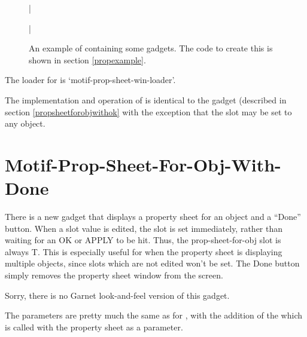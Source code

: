 \begin{figure}
\bar{}
\begin{center}
\end{center}
\caption{An example of 
containing some gadgets.  The code to create this is shown in section
\ref{propexample}.}
\bar{}
\end{figure}

The loader for  is
`motif-prop-sheet-win-loader'.

The implementation and operation of  is
identical to the  gadget (described in
section \ref{propsheetforobjwithok} with the exception
that the  slot may be set to any  object.


\section{Motif-Prop-Sheet-For-Obj-With-Done}

There is a new gadget that displays a property sheet for an object and
a ``Done'' button.  When a slot value is edited, the slot is set
immediately, rather than waiting for an OK or APPLY to be hit.  Thus,
the prop-sheet-for-obj slot  is always T.
This is especially useful for when the property sheet is displaying
multiple objects, since slots which are not edited won't be set.  The
Done button simply removes the property sheet window from the screen.

Sorry, there is no Garnet look-and-feel version of this gadget.

The parameters are pretty much the same as for
, with the addition of the 
which is called with the property sheet as a parameter.


